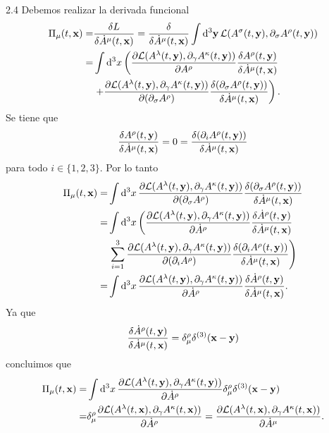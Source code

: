 \documentclass{article}
\begin{document}
2.4 Debemos realizar la derivada funcional
\begin{align}
\begin{split}
\Pi_\mu(t,\vb{x})=&\fdv{L}{\dot{A}^\mu(t,\vb{x})}=\fdv{\dot{A}^\mu(t,\vb{x})}\int \dd[3]{\vb{y}}\mathcal{L}(A^\sigma(t,\vb{y}),\partial_\sigma A^\rho(t,\vb{y}))\\
=&\int\dd[3]{x}\left(\pdv{\mathcal{L}(A^\lambda(t,\vb{y}),\partial_\gamma A^\kappa(t,\vb{y}))}{A^\rho}\fdv{A^\rho(t,\vb{y})}{\dot{A}^\mu(t,\vb{x})}\right.\\
&\left.+\pdv{\mathcal{L}(A^\lambda(t,\vb{y}),\partial_\gamma A^\kappa(t,\vb{y}))}{(\partial_\sigma A^\rho)}\fdv{(\partial_\sigma A^\rho(t,\vb{y}))}{\dot{A}^\mu(t,\vb{x})}\right).
\end{split}
\end{align}
Se tiene que
\begin{equation}
\fdv{A^\rho(t,\vb{y})}{\dot{A}^\mu(t,\vb{x})}=0=\fdv{(\partial_i{A}^\rho(t,\vb{y}))}{\dot{A}^\mu(t,\vb{x})}
\end{equation}
para todo $i\in\{1,2,3\}$. Por lo tanto
\begin{align}
\begin{split}
\Pi_\mu(t,\vb{x})=&\int\dd[3]{x}\pdv{\mathcal{L}(A^\lambda(t,\vb{y}),\partial_\gamma A^\kappa(t,\vb{y}))}{(\partial_\sigma A^\rho)}\fdv{(\partial_\sigma A^\rho(t,\vb{y}))}{\dot{A}^\mu(t,\vb{x})}\\
=&\int\dd[3]{x}\left(\pdv{\mathcal{L}(A^\lambda(t,\vb{y}),\partial_\gamma A^\kappa(t,\vb{y}))}{\dot{A}^\rho}\fdv{\dot{A}^\rho(t,\vb{y})}{\dot{A}^\mu(t,\vb{x})}\right.\\
&\left.\sum_{i=1}^3\pdv{\mathcal{L}(A^\lambda(t,\vb{y}),\partial_\gamma A^\kappa(t,\vb{y}))}{(\partial_i A^\rho)}\fdv{(\partial_i A^\rho(t,\vb{y}))}{\dot{A}^\mu(t,\vb{x})}\right)\\
=&\int\dd[3]{x}\pdv{\mathcal{L}(A^\lambda(t,\vb{y}),\partial_\gamma A^\kappa(t,\vb{y}))}{\dot{A}^\rho}\fdv{\dot{A}^\rho(t,\vb{y})}{\dot{A}^\mu(t,\vb{x})}.
\end{split}
\end{align}
Ya que
\begin{equation}
\fdv{\dot{A}^\rho(t,\vb{y})}{\dot{A}^\mu(t,\vb{x})}=\delta^\rho_\mu\delta^{(3)}(\vb{x}-\vb{y})
\end{equation}
concluimos que 
\begin{align}
\begin{split}
\Pi_\mu(t,\vb{x})=&\int\dd[3]{x}\pdv{\mathcal{L}(A^\lambda(t,\vb{y}),\partial_\gamma A^\kappa(t,\vb{y}))}{\dot{A}^\rho}\delta^\rho_\mu\delta^{(3)}(\vb{x}-\vb{y})\\
=&\delta^\rho_\mu\pdv{\mathcal{L}(A^\lambda(t,\vb{x}),\partial_\gamma A^\kappa(t,\vb{x}))}{\dot{A}^\rho}=\pdv{\mathcal{L}(A^\lambda(t,\vb{x}),\partial_\gamma A^\kappa(t,\vb{x}))}{\dot{A}^\mu}.
\end{split}
\end{align}
\end{document}
